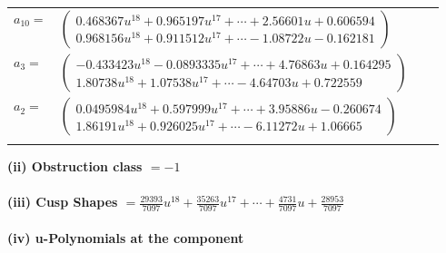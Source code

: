 \documentclass[1p]{elsarticle_modified}
\theoremstyle{definition}
\begin{document}
\begin{tabular}{m{7pt} m{180pt} m{7pt} m{180pt} }
\flushright $a_{10}=$&$\begin{pmatrix}0.468367 u^{18}+0.965197 u^{17}+\cdots+2.56601 u+0.606594\\0.968156 u^{18}+0.911512 u^{17}+\cdots-1.08722 u-0.162181\end{pmatrix}$ \\
\flushright $a_{3}=$&$\begin{pmatrix}-0.433423 u^{18}-0.0893335 u^{17}+\cdots+4.76863 u+0.164295\\1.80738 u^{18}+1.07538 u^{17}+\cdots-4.64703 u+0.722559\end{pmatrix}$ \\
\flushright $a_{2}=$&$\begin{pmatrix}0.0495984 u^{18}+0.597999 u^{17}+\cdots+3.95886 u-0.260674\\1.86191 u^{18}+0.926025 u^{17}+\cdots-6.11272 u+1.06665\end{pmatrix}$\\&\end{tabular}
\flushleft \textbf{(ii) Obstruction class $= -1$}\\~\\
\flushleft \textbf{(iii) Cusp Shapes $= \frac{29393}{7097} u^{18}+\frac{35263}{7097} u^{17}+\cdots+\frac{4731}{7097} u+\frac{28953}{7097}$}\\~\\
\newpage\renewcommand{\arraystretch}{1}
\flushleft \textbf{(iv) u-Polynomials at the component}\newline \\
\end{document}
